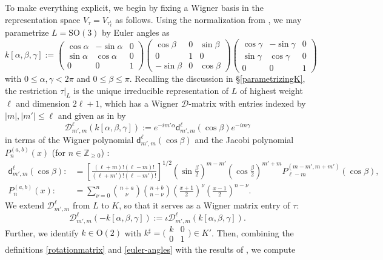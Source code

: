 \documentclass[11pt,oneside]{amsart}
\numberwithin{equation}{section}
\theoremstyle{remark}
\theoremstyle{plain}
\newcommand\OO{\mathrm{O}}
\newcommand\SO{\mathrm{SO}}
\newcommand\wigd{\mathsf{d}}
\renewcommand\leq{\leqslant}
\renewcommand\geq{\geqslant}
\begin{document}
To make everything explicit, we begin by fixing a Wigner basis in the representation space $V_{\tau}=V_{\tau_{\ell}^{\iota}}$ as follows.
Using the normalization from \cite[(2.3)]{Buttcane2018}, we may parametrize $L=\SO(3)$ by Euler angles as
\begin{equation}
\label{euler-angles}
k[\alpha,\beta,\gamma]:=\begin{pmatrix}\cos\alpha&-\sin\alpha&0\\\sin\alpha&\cos\alpha&0\\0&0&1\end{pmatrix}\begin{pmatrix}\cos\beta&0&\sin\beta\\0&1&0\\-\sin\beta&0&\cos\beta\end{pmatrix}\begin{pmatrix}\cos\gamma&-\sin\gamma&0\\\sin\gamma&\cos\gamma&0\\0&0&1\end{pmatrix}
\end{equation}
with $0\leq\alpha,\gamma<2\pi$ and $0\leq\beta\leq\pi$. Recalling the discussion in \S\ref{parametrizingK}, the restriction $\tau|_L$ is the unique irreducible representation of $L$ of highest weight $\ell$ and dimension $2\ell+1$, which has a Wigner $\mathscr{D}$-matrix with entries indexed by $|m|,|m'|\leq\ell$ and given as in \cite[(2.4)]{Buttcane2018} by
\[\mathscr{D}^{\ell}_{m',m}(k[\alpha,\beta,\gamma]):=e^{-im'\alpha}\wigd^{\ell}_{m',m}(\cos\beta)e^{-im\gamma}\]
in terms of the Wigner polynomial $\wigd^{\ell}_{m',m}(\cos\beta)$ and the Jacobi polynomial $P^{(a,b)}_n(x)$ (for $n\in\mathbb{Z}_{\geq 0}$) \cite[(3.72), (3.67)]{BiedenharnLouck1981}:
\begin{align*}
\wigd^{\ell}_{m',m}(\cos\beta):&=\left[\frac{(\ell+m)!(\ell-m)!}{(\ell+m')!(\ell-m')!}\right]^{1/2}\left(\sin\frac{\beta}2\right)^{m-m'}\left(\cos\frac{\beta}2\right)^{m'+m}P^{(m-m',m+m')}_{\ell-m}(\cos\beta),\\
P_n^{(a,b)}(x):&=\sum_{\nu=0}^n\binom{n+a}{\nu}\binom{n+b}{n-\nu}\left(\frac{x+1}{2}\right)^{\nu}\left(\frac{x-1}{2}\right)^{n-\nu}.
\end{align*}
We extend $\mathscr{D}^{\ell}_{m',m}$ from $L$ to $K$, so that it serves as a Wigner matrix entry of $\tau$:
\[\mathscr{D}^{\ell}_{m',m}(-k[\alpha,\beta,\gamma]):=\iota\mathscr{D}^{\ell}_{m',m}(k[\alpha,\beta,\gamma]).\]
Further, we identify $k\in\OO(2)$ with $k{}^{\sharp}=\big(\begin{smallmatrix}k&0\\0&1\end{smallmatrix}\big)\in K'$. Then, combining the definitions \eqref{rotationmatrix} and \eqref{euler-angles} with the results of \cite[p.~688]{Buttcane2018}, we compute
\end{document}
